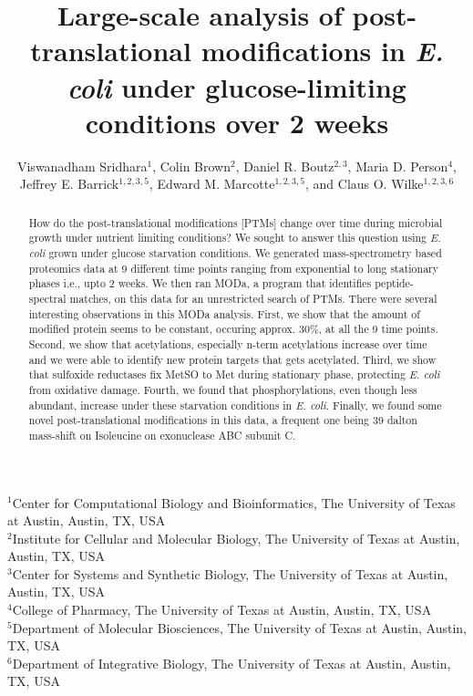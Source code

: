 \documentclass[12pt]{article}
\begin{document}
\title{Large-scale analysis of post-translational modifications in \emph{E. coli} under glucose-limiting conditions over 2 weeks}

\author{Viswanadham Sridhara$^1$, Colin Brown$^{2}$, Daniel R. Boutz$^{2,3}$, Maria D. Person$^{4}$,\\
Jeffrey E. Barrick$^{1,2,3,5}$, Edward M. Marcotte$^{1,2,3,5}$, and Claus O. Wilke$^{1,2,3,6}$}
\maketitle

\noindent
$^1$Center for Computational Biology and Bioinformatics, The University of Texas at Austin, Austin, TX, USA\\
$^2$Institute for Cellular and Molecular Biology, The University of Texas at Austin, Austin, TX, USA\\
$^3$Center for Systems and Synthetic Biology, The University of Texas at Austin, Austin, TX, USA\\
$^4$College of Pharmacy, The University of Texas at Austin, Austin, TX, USA\\
$^5$Department of Molecular Biosciences, The University of Texas at Austin, Austin, TX, USA\\
$^6$Department of Integrative Biology, The University of Texas at Austin, Austin, TX, USA\\


\begin{abstract}
How do the post-translational modifications [PTMs] change over time during microbial growth under nutrient limiting conditions? We sought to answer this question using \emph{E. coli} grown under glucose starvation conditions. We generated mass-spectrometry based proteomics data at 9 different time points ranging from exponential to long stationary phases i.e., upto 2 weeks. We then ran MODa, a program that identifies peptide-spectral matches, on this data for an unrestricted search of PTMs. There were several interesting observations in this MODa analysis. First, we show that the amount of modified protein seems to be constant, occuring approx. 30\%, at all the 9 time points. Second, we show that acetylations, especially n-term acetylations increase over time and we were able to identify new protein targets that gets acetylated. Third, we show that sulfoxide reductases fix MetSO to Met during stationary phase, protecting \emph{E. coli} from oxidative damage. Fourth, we found that phosphorylations, even though less abundant, increase under these starvation conditions in \emph{E. coli}. Finally, we found some novel post-translational modifications in this data, a frequent one being 39 dalton mass-shift on Isoleucine on exonuclease ABC subunit C.
\end{abstract}
\end{document}
